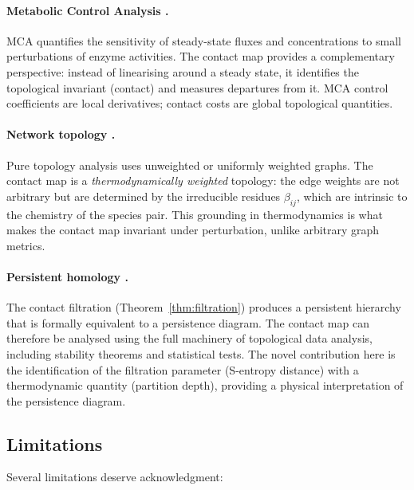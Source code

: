 \documentclass[11pt,twocolumn]{article}
\theoremstyle{plain}
\theoremstyle{definition}
\begin{document}
\paragraph{Metabolic Control Analysis \cite{kacser1973control, fell1992metabolic,
heinrich1974linear}.}
MCA quantifies the sensitivity of steady-state fluxes and concentrations to
small perturbations of enzyme activities. The contact map provides a
complementary perspective: instead of linearising around a steady state, it
identifies the topological invariant (contact) and measures departures from it.
MCA control coefficients are local derivatives; contact costs are global
topological quantities.

\paragraph{Network topology \cite{barabasi2004network, jeong2000large,
ravasz2002hierarchical}.}
Pure topology analysis uses unweighted or uniformly weighted graphs. The contact
map is a \emph{thermodynamically weighted} topology: the edge weights are not
arbitrary but are determined by the irreducible residues $\beta_{ij}$, which
are intrinsic to the chemistry of the species pair. This grounding in
thermodynamics is what makes the contact map invariant under perturbation,
unlike arbitrary graph metrics.

\paragraph{Persistent homology \cite{carlsson2009topology,
edelsbrunner2008persistent, rabadan2020topological}.}
The contact filtration (Theorem~\ref{thm:filtration}) produces a persistent
hierarchy that is formally equivalent to a persistence diagram. The contact
map can therefore be analysed using the full machinery of topological data
analysis, including stability theorems and statistical tests. The novel
contribution here is the identification of the filtration parameter (S-entropy
distance) with a thermodynamic quantity (partition depth), providing a physical
interpretation of the persistence diagram.

\subsection{Limitations}

Several limitations deserve acknowledgment:
\end{document}
